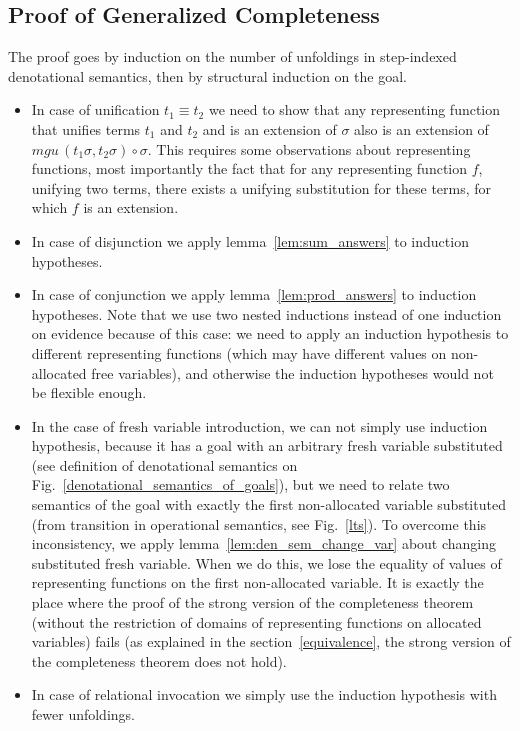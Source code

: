 \subsection{Proof of Generalized Completeness}
\label{appendix_gen_completeness_proof}

The proof goes by induction on the number of unfoldings in step-indexed denotational semantics, then by structural induction on the goal.

\begin{itemize}
\item In case of unification $t_1\equiv t_2$ we need to show that any representing function that unifies terms $t_1$ and $t_2$ and is an extension of $\sigma$ also is an extension of $mgu\,(t_1 \sigma, t_2 \sigma) \circ \sigma$. This requires some observations about representing functions, most importantly the fact that for any representing function $f$, unifying two terms, there exists a unifying substitution for these terms, for which $f$ is an extension.
\item In case of disjunction we apply lemma~\ref{lem:sum_answers} to induction hypotheses.
\item In case of conjunction we apply lemma~\ref{lem:prod_answers} to induction hypotheses. Note that we use two nested inductions instead of one induction on evidence because of this case: we need to apply an induction hypothesis to different representing functions (which may have different values on non-allocated free variables), and otherwise the induction hypotheses would not be flexible enough.
\item In the case of fresh variable introduction, we can not simply use induction hypothesis, because it has a goal with an arbitrary fresh variable substituted (see definition of denotational semantics on Fig.~\ref{denotational_semantics_of_goals}), but we need to relate two semantics of the goal with exactly the first non-allocated variable substituted (from transition in operational semantics, see Fig.~\ref{lts}). To overcome this inconsistency, we apply lemma~\ref{lem:den_sem_change_var} about changing substituted fresh variable. When we do this, we lose the equality of values of representing functions on the first non-allocated variable. It is exactly the place where the proof of the strong version of the completeness theorem (without the restriction of domains of representing functions on allocated variables) fails (as explained in the section~\ref{equivalence}, the strong version of the completeness theorem does not hold).
\item In case of relational invocation we simply use the induction hypothesis with fewer unfoldings.
\end{itemize}

